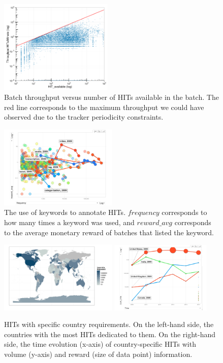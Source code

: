 \begin{figure}[tb]
	\centering
		\includegraphics[width=0.48\textwidth]{figures/motiv_mturk}
	\caption{Batch throughput versus number of HITs available in the batch. The red line corresponds to the maximum throughput we could have observed due to the tracker periodicity constraints.\protect\footnotemark}
	\label{fig:motiv}
\end{figure}
\begin{figure}[tb]
	\centering
		\includegraphics[width=0.5\textwidth]{figures/tagEvolution}
	\caption{The use of keywords to annotate HITs. $frequency$ corresponds to how many times a keyword was used, and $reward\_avg$ corresponds to the average monetary reward of batches that listed the keyword.}
	\label{fig:tagEvolution}
\end{figure}
\begin{figure}[tb]
	\centering
		\includegraphics[width=0.5\textwidth]{figures/map}
		\includegraphics[width=0.43\textwidth]{figures/countriesTime}
	\caption{HITs with specific country requirements. On the left-hand side, the countries with the most HITs dedicated to them. On the right-hand side, the time evolution (x-axis) of country-specific HITs with volume (y-axis) and reward (size of data point) information.}
	\label{fig:country}
\end{figure}


